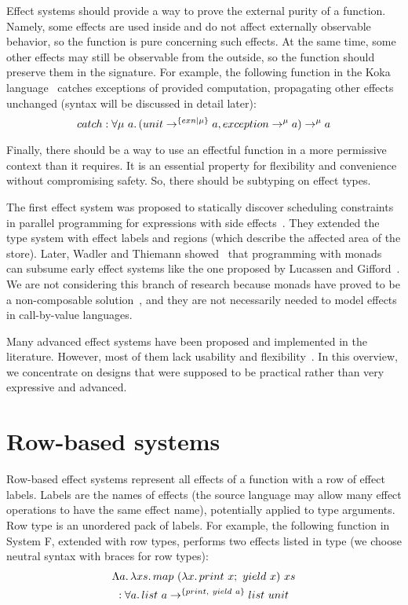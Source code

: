 \documentclass[conference]{IEEEtran}
\newcommand{\seq}{;~}
\newcommand{\ap}{~}
\begin{document}
    Effect systems should provide a way to prove the external purity of a function.
    Namely, some effects are used inside and do not affect externally observable behavior, so the function is pure concerning such effects.
    At the same time, some other effects may still be observable from the outside, so the function should preserve them in the signature.
    For example, the following function in the Koka language~\cite{leijen2014koka, leijen2017type} catches exceptions of provided computation, propagating other effects unchanged (syntax will be discussed in detail later):
    \[catch : \forall \mu\ap a\ldotp (unit\to^{\{exn|\mu\}} a, exception \to^{\mu} a) \to^\mu a\]

    Finally, there should be a way to use an effectful function in a more permissive context than it requires.
    It is an essential property for flexibility and convenience without compromising safety.
    So, there should be subtyping on effect types.


    The first effect system was proposed to statically discover scheduling constraints in parallel programming for expressions with side effects~\cite{lucassen1988polymorphic}.
    They extended the type system with effect labels and regions (which describe the affected area of the store).
    Later, Wadler and Thiemann showed~\cite{wadler2003marriage} that programming with monads~\cite{moggi1988computational} can subsume early effect systems like the one proposed by Lucassen and Gifford~\cite{lucassen1988polymorphic}.
    We are not considering this branch of research because monads have proved to be a non-composable solution~\cite{liang1995monad, kiselyov2013extensible}, and they are not necessarily needed to model effects in call-by-value languages.

    Many advanced effect systems have been proposed and implemented in the literature.
    However, most of them lack usability and flexibility~\cite{odersky2022scoped}.
    In this overview, we concentrate on designs that were supposed to be practical rather than very expressive and advanced.


    \section{Row-based systems} \label{sec:rows}

    Row-based effect systems represent all effects of a function with a row of effect labels.
    Labels are the names of effects (the source language may allow many effect operations to have the same effect name), potentially applied to type arguments.
    Row type is an unordered pack of labels.
    For example, the following function in System F, extended with row types, performs two effects listed in type (we choose neutral syntax with braces for row types):
    \begin{multline*}
        \Lambda a\ldotp\lambda xs\ldotp map \ap (\lambda x\ldotp print\ap x\seq yield\ap x) \ap xs \\ : \forall a \ldotp list\ap a \to^{\{print, ~yield \ap a\}} list \ap unit
    \end{multline*}
\end{document}
